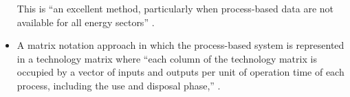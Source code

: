 \documentclass[10pt]{article}
\begin{document}
\begin{itemize}
  This is ``an  excellent method, particularly when process-based data are not available for all energy sectors'' \cite{dixit2017embodied}.


\item A matrix notation approach in which the process-based system is represented 
in a technology matrix where ``each column of the  technology matrix is occupied  by  a  vector  of  inputs  and  outputs  per  unit  of operation time of each process, including the use and disposal phase,'' 
\cite{suh2004system}. %

\end{itemize}


 





\end{document}
